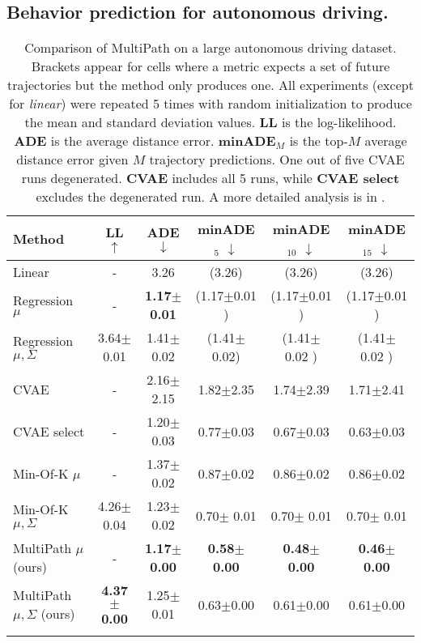\documentclass{article}
\newcommand{\multiflow}{MultiPath\xspace}
\newcommand{\supsecref}[1]{\secref{#1}}
\begin{document}
\subsection{Behavior prediction for autonomous driving.}
\label{sec:bp}



\begin{table}[!tbp]
\caption{\small Comparison of \multiflow on a large autonomous driving dataset. Brackets appear for cells where a metric expects a set of future trajectories but the method only produces one. All experiments (except for {\em linear}) were repeated 5 times with random initialization to produce the mean and standard deviation values. \textbf{LL} is the log-likelihood. \textbf{ADE} is the average distance error. {\bf minADE$_M$} is the top-$M$ average distance error given $M$ trajectory predictions. One out of five CVAE runs degenerated. \textbf{CVAE} includes all 5 runs, while \textbf{CVAE select} excludes the degenerated run. A more detailed analysis is in \supsecref{sec:analysis}.}
\label{tbl:driving-sota}
\centering
\begin{tabular}{lccccc}
\toprule
\multirow{1}{*}{Method} & LL $\uparrow$ & ADE $\downarrow$ & minADE$_5$ $\downarrow$ & minADE$_{10}$ $\downarrow$ & minADE$_{15}$ $\downarrow$ \tabularnewline
\midrule
Linear & - & 3.26 & (3.26) & (3.26) & (3.26) \tabularnewline
Regression $\mu$ & - & \textbf{1.17\tiny{$\pm$0.01}} & (1.17{\tiny$\pm$0.01} ) & (1.17{\tiny$\pm$0.01} ) & (1.17{\tiny$\pm$0.01} ) \tabularnewline
Regression $\mu,\Sigma$ & 3.64\tiny{$\pm$0.01} & 1.41\tiny{$\pm$ 0.02} & (1.41{\tiny $\pm$ 0.02}) & (1.41\tiny{$\pm$ 0.02} ) & (1.41\tiny{$\pm$ 0.02} ) \tabularnewline
CVAE & - & 2.16\tiny{$\pm$2.15} & 1.82\tiny{$\pm$2.35}  & 1.74\tiny{$\pm$2.39}  & 1.71\tiny{$\pm$2.41}  \tabularnewline
CVAE select & - & 1.20\tiny{$\pm$0.03} & 0.77\tiny{$\pm$0.03} &  0.67\tiny{$\pm$0.03} &  0.63\tiny{$\pm$0.03} \tabularnewline
Min-Of-K $\mu$ \cite{Cui19} & - & 1.37\tiny{$\pm$0.02} & 0.87{\tiny$\pm$0.02} & 0.86{\tiny$\pm$0.02} & 0.86{\tiny$\pm$0.02} \tabularnewline
Min-Of-K $\mu, \Sigma$ \cite{Cui19} & 4.26\tiny{$\pm$0.04} & 1.23\tiny{$\pm$ 0.02} & 0.70{\tiny $\pm$ 0.01} & 0.70\tiny{$\pm$ 0.01} & 0.70\tiny{$\pm$ 0.01} \tabularnewline
MultiPath $\mu$ (ours) & - & \textbf{1.17\tiny{$\pm$0.00}} & \textbf{0.58\tiny{$\pm$0.00}} & \textbf{0.48\tiny{$\pm$0.00}} & \textbf{0.46\tiny{$\pm$0.00}} \tabularnewline
MultiPath $\mu,\Sigma$ (ours) & \textbf{4.37\tiny{$\pm$0.00}} & 1.25\tiny{$\pm$0.01} & 0.63\tiny{$\pm$0.00} &  0.61\tiny{$\pm$0.00} &  0.61\tiny{$\pm$0.00} \tabularnewline
\bottomrule
\vspace{-0.2cm}
\end{tabular}
\end{table}
\end{document}
